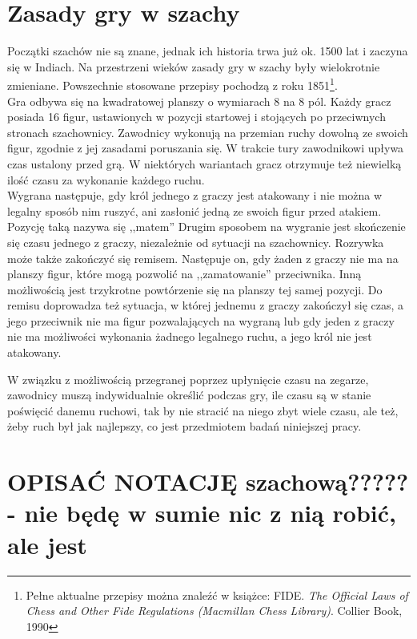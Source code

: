 \documentclass[inzynierska]{pwr_wmat_praca_dyplomowa}
\theoremstyle{plain}
\numberwithin{theorem}{chapter}
\theoremstyle{definition}
\numberwithin{theorem}{chapter}
\begin{document}
\section{Zasady gry w szachy}
Początki szachów nie są znane, jednak ich historia trwa już ok. 1500 lat i zaczyna się w Indiach. Na przestrzeni wieków zasady gry w szachy były wielokrotnie zmieniane. Powszechnie stosowane przepisy pochodzą z roku 1851\footnote{Pełne aktualne przepisy można znaleźć w książce: FIDE. \textit{The Official Laws of Chess and Other Fide Regulations (Macmillan Chess Library)}. Collier Book, 1990}.\\

Gra odbywa się na kwadratowej planszy o wymiarach 8 na 8 pól. Każdy gracz posiada 16 figur, ustawionych w pozycji startowej i stojących po przeciwnych stronach szachownicy. Zawodnicy wykonują na przemian ruchy dowolną ze swoich figur, zgodnie z jej zasadami poruszania się. W trakcie tury zawodnikowi upływa czas ustalony przed grą. W niektórych wariantach gracz otrzymuje też niewielką ilość czasu za wykonanie każdego ruchu.\\

Wygrana następuje, gdy król jednego z graczy jest atakowany i nie można w legalny sposób nim ruszyć, ani zasłonić jedną ze swoich figur przed atakiem. Pozycję taką nazywa się ,,matem'' Drugim sposobem na wygranie jest skończenie się czasu jednego z graczy, niezależnie od sytuacji na szachownicy. 
Rozrywka może także zakończyć się remisem. Następuje on, gdy żaden z graczy nie ma na planszy figur, które mogą pozwolić na ,,zamatowanie'' przeciwnika. Inną możliwością jest trzykrotne powtórzenie się na planszy tej samej pozycji. Do remisu doprowadza też sytuacja, w której jednemu z graczy zakończył się czas, a jego przeciwnik nie ma figur pozwalających na wygraną lub gdy jeden z graczy nie ma możliwości wykonania żadnego legalnego ruchu, a jego król nie jest atakowany.

W związku z możliwością przegranej poprzez upłynięcie czasu na zegarze, zawodnicy muszą indywidualnie określić podczas gry, ile czasu są w stanie poświęcić danemu ruchowi, tak by nie stracić na niego zbyt wiele czasu, ale też, żeby ruch był jak najlepszy, co jest przedmiotem badań niniejszej pracy.

\section{OPISAĆ NOTACJĘ szachową????? - nie będę w sumie nic z nią robić, ale jest}
\end{document}
